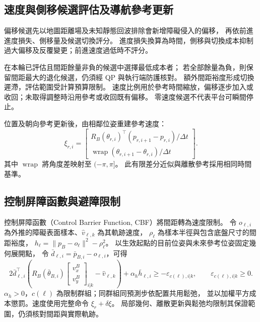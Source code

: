 \subsection{速度與側移候選評估及導航參考更新}
\label{subsec:candidate_reference_update}

偏移候選先以地圖距離場及未知靜態回波排除會新增障礙侵入的偏移，
再依前進進度損失、側移量及候選切換評分。
進度損失換算為時間，側移與切換成本抑制過大偏移及反覆變更；前進速度過低時不評分。

在本輪已評估且間距餘量非負的候選中選擇最低成本者；
若全部餘量為負，則保留間距最大的退化候選，仍須經 QP 與執行端防護核對。
額外間距裕度形成切換遲滯，評估範圍受計算預算限制。
速度比例用於參考時間縮放，偏移逐步加入或收回；未取得調整時沿用參考或收回既有偏移。
零速度候選不代表平台可瞬間停止。

位置及朝向參考更新後，由相鄰位姿重建參考速度：
\begin{equation}
    \xi_{r,i}=
    \begin{bmatrix}
        R_B(\theta_{r,i})^\top
        (p_{r,i+1}-p_{r,i})/\Delta t\\
        \operatorname{wrap}(\theta_{r,i+1}-\theta_{r,i})/\Delta t
    \end{bmatrix}.
    \label{eq:ch3_reference_velocity_reconstruction}
\end{equation}
其中 $\operatorname{wrap}$ 將角度差映射至 $(-\pi,\pi]$。
此有限差分近似與離散參考採用相同時間基準。

\subsection{控制屏障函數與避障限制}
\label{subsec:cbf_obstacle_constraints}

控制屏障函數（Control Barrier Function, CBF）將間距轉為速度限制\cite{ames2019cbf}。
令 $o_{\ell,i}$ 為外推的障礙表面樣本、$\hat v_{\ell,k}$ 為其軌跡速度，
$\rho_\ell$ 為樣本半徑與包含底盤尺寸的間距裕度，
$h_\ell=\|p_B-o_\ell\|^2-\rho_\ell^2$。
以生效起點的目前位姿與未來參考位姿固定幾何展開點，
令 $\bar d_{\ell,i}=\bar p_{B,i}-o_{\ell,i}$，可得
\begin{equation}
    2\bar d_{\ell,i}^{\top}
    \left(R_B(\bar\theta_{B,i})
    \begin{bmatrix}v_x^B\\v_y^B\end{bmatrix}_{i|k}
    -\hat v_{\ell,k}\right)
    +\alpha_h\bar h_{\ell,i}
    \geq-\varepsilon_{c(\ell),i|k},
    \qquad \varepsilon_{c(\ell),i|k}\geq0 .
    \label{eq:ch3_cbf_affine_constraint}
\end{equation}
$\alpha_h>0$，$c(\ell)$ 為限制群組；同群組同預測步依配置共用鬆弛，
並以加權平方成本懲罰。速度使用完整命令 $\xi_r+\delta\xi$。
局部幾何、離散更新與鬆弛均限制其保證範圍，仍須核對間距與實際軌跡。

